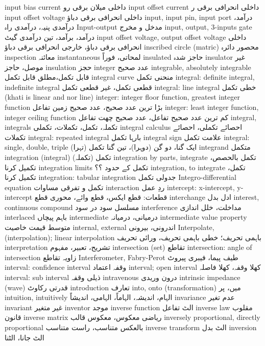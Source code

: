 input bias current	داخلی میلان برقی رو
input offset current	داخلی انحرافی برقی ر
input offset voltage	داخلی انحرافی برقی دباؤ
input, input pin, input port	درآمد، درآمدی پنیہ، درآمدی راہ
Input-output	مدخل و مخرج
input, output, 3-inputs gate	درآمد، برآمد، تین درآمدی گیٹ
input offset voltage, output offset voltage	داخلی انحرافی برقی دباؤ، خارجی انحرافی برقی دباؤ
inscribed circle (matric)	محصور دائرہ
inspection	معائنہ
instantaneous	لمحاتی، فوراً
insulated	حاجز شدہ
insulator	غیر موصل، حاجز
insulation	حجز
integer	عدد صحیح
integrable, absolutely integrable	قابل تکمل،مطلق قابل تکمل
integral curve	منحنی تکمل
integral: definite integral, indefinite integral	قطعی تکمل، غیر قطعی تکمل
integral: line integral	خطی تکمل (khati is linear and nor line)
integer: integer floor function, greatest integer function	بڑا ترین عدد صحیح، عدد صحیح زمین تفاعل
integer:  least integer function, integer ceiling function	کم ترین عدد صحیح تفاعل،  عدد صحیح چھت تفاعل
integral, integrals	تکملہ، تکمل، تکملات، تکملی
integral calculus	احصائے تکملی، احصائے تکملات
integral: repeated integral	بارہا تکمل
integral sign	علامت تکمل
integral: single, double, triple	ایک گنا، دو گن (دوہرا)، تین گنا تکمل (تہرا)
integrand	متکمل
integration (integral)	تکمل (تکملہ)
integration by parts, integrate	تکمل بالحصص، تکمیل کرنا
integration limits	تکمل کے حدود ؟؟
integration, to integrate	تکمل، تکمیل کرنا 
integration: tabular integration	جدولی تکمل
Integro-differential equation	تکمل و تفرقی مساوات
interaction	ردِ عمل
intercept: x-intercept, y-intercept	قطعات: قطع ایکس، قطع وائے، محوری قطع
interchange	ادل بدل
interest, continuous compound	مسلسل سود در سود
interference	مداخلت، خلل اندازی
interlaced	باہم پیچاں
intermediate	درمیانی، درمیانہ
intermediate value property	متوسط قیمت خاصیت
internal, external	اندرونی، بیرونی
Interpolate, (interpolation); linear interpolation	باہمی تحریف؛ خطی باہمی تحریف، ورائی تحریف
interpretation	تشریح، تعبیر، مفہوم
intersection (set)	تقاطع
intersection: angle of intersection	زاویہ تقاطع
Interferometer, Fabry-Perot	طیف پیما، فیبری پیروٹ
interval: confidence interval	وقفہ اعتماد
interval; open interval	کھلا وقفہ، کھلا فاصلہ
interval: sub interval	ذیلی وقفہ
intravenous	درون وریدی
intrinsic impedance (wave)	قدرتی رکاوٹ
introduction	تعارف
into, onto (transformation)	میں، پر
intuition, intuitively	الہام، اندیشہ، الہاماً، الہامی، اندیشاً
invariance	عدم تغیر
invariant	غیر متغیر
inventor	موجد
inverse function	الٹ تفاعل
inverse law	مقلوب قانون
inverse matrix	ریاضی معکوس، معکوس قالب
inversely proportional, directly proportional	بالعکس متناسب، راست متناسب
inverse transform	الٹ بدل
inversion	الٹ جانا، الٹنا
